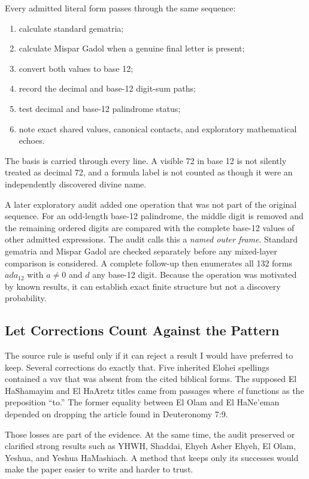 Every admitted literal form passes through the same sequence:

\begin{enumerate}
\item calculate standard gematria;
\item calculate Mispar Gadol when a genuine final letter is present;
\item convert both values to base 12;
\item record the decimal and base-12 digit-sum paths;
\item test decimal and base-12 palindrome status;
\item note exact shared values, canonical contacts, and exploratory mathematical echoes.
\end{enumerate}

The basis is carried through every line. A visible 72 in base 12 is not silently treated as decimal 72, and a formula label is not counted as though it were an independently discovered divine name.

A later exploratory audit added one operation that was not part of the original sequence. For an odd-length base-12 palindrome, the middle digit is removed and the remaining ordered digits are compared with the complete base-12 values of other admitted expressions. The audit calls this a \emph{named outer frame}. Standard gematria and Mispar Gadol are checked separately before any mixed-layer comparison is considered. A complete follow-up then enumerates all 132 forms $ada_{12}$ with $a\neq0$ and $d$ any base-12 digit. Because the operation was motivated by known results, it can establish exact finite structure but not a discovery probability.

\subsection{Let Corrections Count Against the Pattern}

The source rule is useful only if it can reject a result I would have preferred to keep. Several corrections do exactly that. Five inherited Elohei spellings contained a vav that was absent from the cited biblical forms. The supposed El HaShamayim and El HaAretz titles came from passages where \emph{el} functions as the preposition ``to.'' The former equality between El Olam and El HaNe'eman depended on dropping the article found in Deuteronomy 7:9.

Those losses are part of the evidence. At the same time, the audit preserved or clarified strong results such as YHWH, Shaddai, Ehyeh Asher Ehyeh, El Olam, Yeshua, and Yeshua HaMashiach. A method that keeps only its successes would make the paper easier to write and harder to trust.

